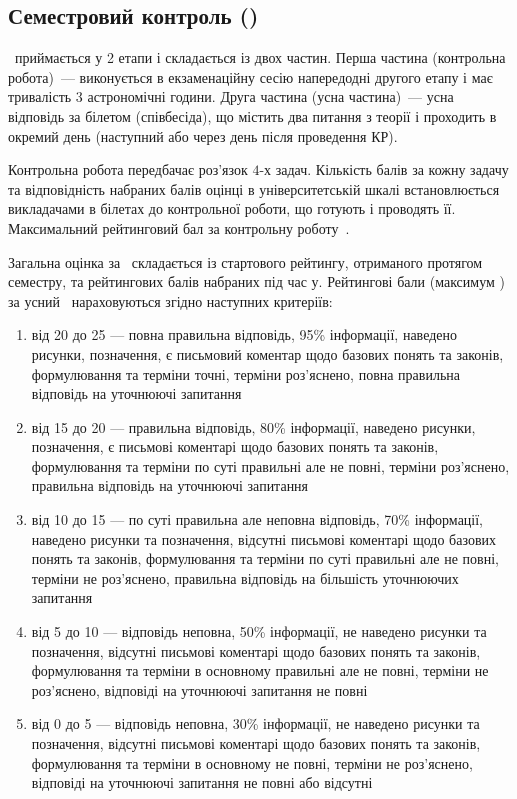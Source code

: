 \documentclass{Syllabus}
\begin{document}
\subsection*{Семестровий контроль (\control)}

\pgfmathsetmacro{\kontrolBal}{\kontrolBalp + \kontrolBalu}

\Control\ приймається у 2 етапи і складається із двох частин. Перша частина (контрольна робота)~--- виконується в екзаменаційну сесію напередодні другого етапу і має тривалість $3$ астрономічні години. Друга частина (усна частина)~--- усна відповідь за білетом (співбесіда), що містить два питання з теорії і проходить в окремий день (наступний або через день після проведення КР).

Контрольна робота передбачає роз'язок $4$-х задач. Кількість балів за кожну задачу та відповідність набраних балів оцінці в університетській шкалі встановлюється викладачами в білетах до контрольної роботи, що готують і проводять її. Максимальний рейтинговий бал за контрольну роботу~\kontrolBalp.

Загальна оцінка за \control\ складається із стартового рейтингу, отриманого протягом семестру, та рейтингових балів набраних під час \control у. Рейтингові бали (максимум \kontrolBalu) за усний \control\ нараховуються згідно наступних критеріїв:
\begin{enumerate}[label=$\bullet$]
\item від 20 до 25 --- повна правильна відповідь, 95\% інформації, наведено рисунки, позначення, є письмовий коментар щодо базових понять та законів, формулювання та терміни точні, терміни роз’яснено, повна правильна відповідь на уточнюючі запитання
\item від 15 до 20 --- правильна відповідь, 80\% інформації, наведено рисунки, позначення, є письмові коментарі щодо базових понять та законів, формулювання та терміни по суті правильні але не повні, терміни роз’яснено, правильна відповідь на уточнюючі запитання
\item від 10 до 15 --- по суті правильна але неповна відповідь, 70\% інформації, наведено рисунки та позначення, відсутні письмові коментарі щодо базових понять та законів, формулювання та терміни по суті правильні але не повні, терміни не роз’яснено, правильна відповідь на більшість уточнюючих запитання
\item від 5 до 10 --- відповідь неповна, 50\% інформації, не наведено рисунки та позначення, відсутні письмові коментарі щодо базових понять та законів, формулювання та терміни в основному правильні але не повні, терміни не роз’яснено, відповіді на уточнюючі запитання не повні
\item від 0 до 5 --- відповідь неповна, 30\% інформації, не наведено рисунки та позначення, відсутні письмові коментарі щодо базових понять та законів, формулювання та терміни в основному не повні, терміни не роз’яснено, відповіді на уточнюючі запитання не повні або відсутні
\end{enumerate}
\end{document}
